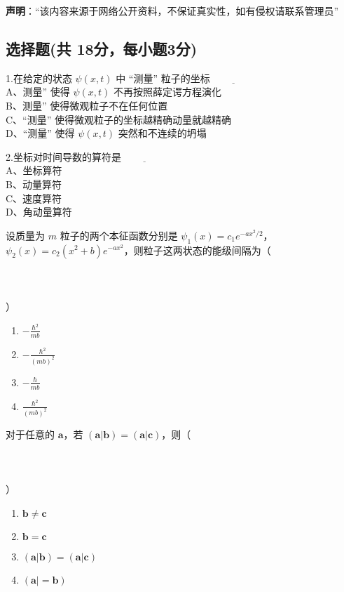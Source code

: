 
\textbf{声明}：“该内容来源于网络公开资料，不保证真实性，如有侵权请联系管理员”

\subsection{选择题(共 18分，每小题3分)}

1.在给定的状态 $\psi(x,t)$ 中 “测量” 粒子的坐标$\underline{\hspace{2cm}}$\\
    A、测量” 使得 $\psi(x,t)$ 不再按照薛定谔方程演化\\
    B、测量” 使得微观粒子不在任何位置\\
    C、“测量” 使得微观粒子的坐标越精确动量就越精确\\
    D、“测量” 使得 $\psi(x,t)$ 突然和不连续的坍塌
   
2.坐标对时间导数的算符是$\underline{\hspace{2cm}}$\\
    A、坐标算符 \\
    B、动量算符 \\
    C、速度算符 \\
    D、角动量算符\\

    
\item  设质量为 $m$ 粒子的两个本征函数分别是 $\psi_1(x) = c_1e^{-ax^2/2}$，$\psi_2(x) = c_2(x^2+b)e^{-ax^2}$，则粒子这两状态的能级间隔为（\\ \\ \\ \\ ）
    \begin{enumerate}
    \item $-\frac{\hbar^2}{mb}$
    \item $-\frac{\hbar^2}{(mb)^2}$
    \item $-\frac{\hbar}{mb}$
    \item $\frac{\hbar^2}{(mb)^2}$
    \end{enumerate}

\item  对于任意的 $\mathbf{a}$，若 $(\mathbf{a}|\mathbf{b}) = (\mathbf{a}|\mathbf{c})$，则（\\ \\ \\ \\ ）
    \begin{enumerate}
    \item $\mathbf{b} \ne \mathbf{c}$
    \item $\mathbf{b} = \mathbf{c}$
    \item $(\mathbf{a}| \mathbf{b}) = (\mathbf{a}| \mathbf{c})$
    \item $(\mathbf{a}| = \mathbf{b})$
    \end{enumerate}

